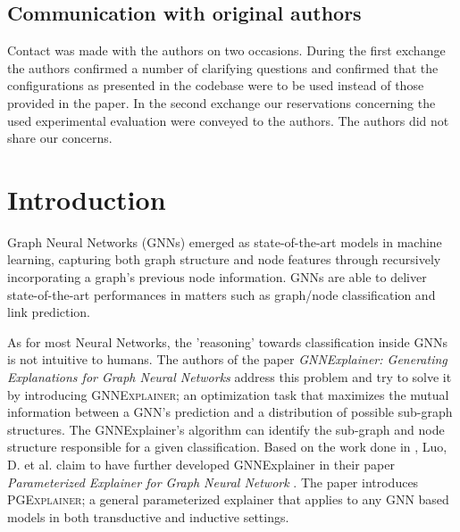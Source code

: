 \documentclass{article}
\begin{document}

\subsection*{Communication with original authors}
Contact was made with the authors on two occasions. During the first exchange the authors confirmed a number of clarifying questions and confirmed that the configurations as presented in the codebase were to be used instead of those provided in the paper. In the second exchange our reservations concerning the used experimental evaluation were conveyed to the authors. The authors did not share our concerns. 

\newpage %
\section{Introduction}
Graph Neural Networks (GNNs) emerged as state-of-the-art models in machine learning, capturing both graph structure and node features through recursively incorporating a graph's previous node information. GNNs are able to deliver state-of-the-art performances in matters such as graph/node classification and link prediction.

As for most Neural Networks, the 'reasoning' towards classification inside GNNs is not intuitive to humans. The authors of the paper \textit{GNNExplainer: Generating Explanations for Graph Neural Networks} \cite{ying2019gnnexplainer} address this problem and try to solve it by introducing \textsc{GNNExplainer}; an optimization task that maximizes the mutual information between a GNN's prediction and a distribution of possible sub-graph structures. The GNNExplainer's algorithm can identify the sub-graph and node structure responsible for a given classification.
Based on the work done in \cite{ying2019gnnexplainer}, Luo, D. et al. claim to have further developed GNNExplainer in their paper \textit{Parameterized Explainer for Graph Neural Network} \cite{luo2020parameterized}. The paper introduces \textsc{PGExplainer}; a general parameterized explainer that applies to any GNN based models in both transductive and inductive settings. 
\end{document}
